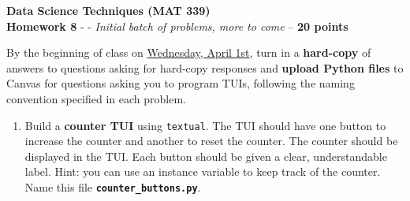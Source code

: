 \documentclass[12pt]{article}
\begin{document}
	
	\begin{center}
		\textbf{Data Science Techniques (MAT 339)} \\
		\textbf{Homework 8} - - \textit{Initial batch of problems, more to come} -- \textbf{20 points}\\
	\end{center}
	By the beginning of class on \underline{Wednesday, April 1st}, turn in a \textbf{hard-copy} of answers to questions asking for hard-copy responses and \textbf{upload Python files} to Canvas for questions asking you to program TUIs, following the naming convention specified in each problem. \\
	
	\begin{enumerate}
		
		\item Build a \textbf{counter TUI} using \texttt{textual}. The TUI should have one button to increase the counter and another to reset the counter. The counter should be displayed in the TUI. Each button should be given a clear, understandable label. Hint: you can use an instance variable to keep track of the counter. Name this file \textbf{\texttt{counter\_buttons.py}}.
	
		



\end{enumerate}
\end{document}
